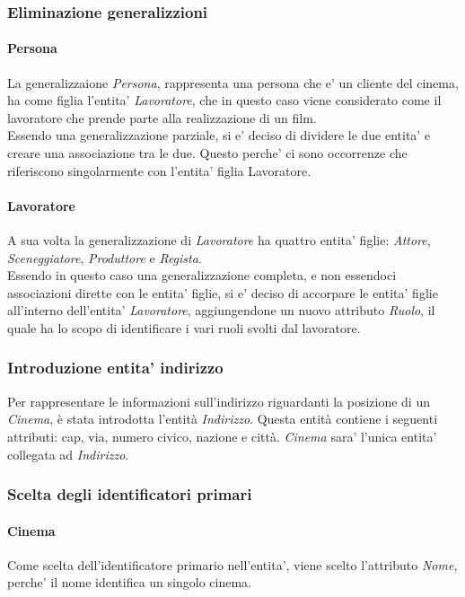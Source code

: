 \documentclass[10pt]{article}
\begin{document}
	\subsubsection{Eliminazione generalizzioni}
	\paragraph{Persona}
	La generalizzaione \textit{Persona}, rappresenta una persona che e' un cliente del cinema, ha come figlia l'entita' \textit{Lavoratore}, che in questo caso viene considerato come il lavoratore che prende parte alla realizzazione di un film.\\
	Essendo una generalizzazione parziale, si e' deciso di dividere le due entita' e creare una associazione tra le due. Questo perche' ci sono occorrenze che riferiscono singolarmente con l'entita' figlia Lavoratore.
	\paragraph{Lavoratore}
	A sua volta la generalizzazione di \textit{Lavoratore} ha quattro entita' figlie: \textit{Attore}, \textit{Sceneggiatore}, \textit{Produttore} e \textit{Regista}.\\
	Essendo in questo caso una generalizzazione completa, e non essendoci associazioni dirette con le entita' figlie, si e' deciso di accorpare le entita' figlie all'interno dell'entita' \textit{Lavoratore}, aggiungendone un nuovo attributo \textit{Ruolo}, il quale ha lo scopo di identificare i vari ruoli svolti dal lavoratore.
	\subsubsection{Introduzione entita' indirizzo}
	Per rappresentare le informazioni sull’indirizzo riguardanti la posizione di un \textit{Cinema}, è stata introdotta l’entità \textit{Indirizzo}. Questa entità contiene i seguenti attributi: cap, via, numero civico, nazione e città. \textit{Cinema} sara' l'unica entita' collegata ad \textit{Indirizzo}.
	\subsubsection{Scelta degli identificatori primari}
	\paragraph{Cinema}
	Come scelta dell'identificatore primario nell'entita', viene scelto l'attributo \textit{Nome}, perche' il nome identifica un singolo cinema.
\end{document}
